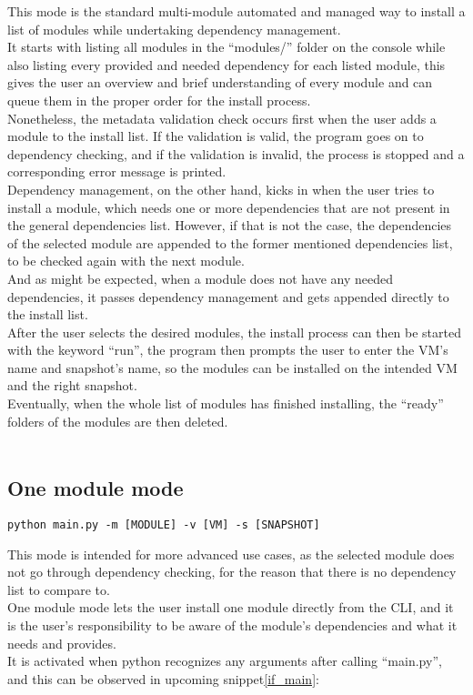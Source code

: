 This mode is the standard multi-module automated and managed way to install a list of modules while undertaking dependency management.\\
It starts with listing all modules in the “modules/” folder on the console while also listing every provided and needed dependency for each listed module, this gives the user an overview and brief understanding of every module and can queue them in the proper order for the install process.\\
Nonetheless, the metadata validation check occurs first when the user adds a module to the install list. If the validation is valid, the program goes on to dependency checking, and if the validation is invalid, the process is stopped and a corresponding error message is printed.\\
Dependency management, on the other hand, kicks in when the user tries to install a module, which needs one or more dependencies that are not present in the general dependencies list.
However, if that is not the case, the dependencies of the selected module are appended to the former mentioned dependencies list, to be checked again with the next module.\\
And as might be expected, when a module does not have any needed dependencies, it passes dependency management and gets appended directly to the install list.\\
After the user selects the desired modules, the install process can then be started with the keyword “run”, the program then prompts the user to enter the VM’s name and snapshot’s name, so the modules can be installed on the intended VM and the right snapshot.\\
Eventually, when the whole list of modules has finished installing, the “ready” folders of the modules are then deleted.
\\
\\

\subsection{One module mode}
\begin{lstlisting}[caption=One module command, style=pythonstyle]
python main.py -m [MODULE] -v [VM] -s [SNAPSHOT]
\end{lstlisting}

This mode is intended for more advanced use cases, as the selected module does not go through dependency checking, for the reason that there is no dependency list to compare to.\\
One module mode lets the user install one module directly from the CLI, and it is the user’s responsibility to be aware of the module’s dependencies and what it needs and provides.\\
It is activated when python recognizes any arguments after calling “main.py”, and this can be observed in upcoming snippet\ref{if_main}:

